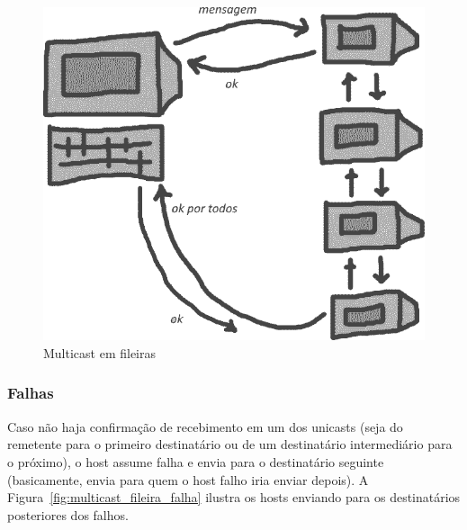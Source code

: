 \documentclass[12pt,twocolumn]{article}
\begin{document}
				\begin{figure}[t]	%
					\centering
					\includegraphics[width=0.9\linewidth]{multicast_encadeado.png}%
					\caption{Multicast em fileiras}%
					\label{fig:multicast_fileira}				
				\end{figure}														
			
				\subsubsection{Falhas} 	
				
					Caso não haja confirmação de recebimento em um dos unicasts (seja do remetente para o primeiro destinatário ou de um destinatário intermediário para o próximo), o host assume falha e envia para o destinatário seguinte (basicamente, envia para quem o host falho iria enviar depois).
					A Figura~\ref{fig:multicast_fileira_falha} ilustra os hosts enviando para os destinatários posteriores dos falhos.
					
\end{document}
